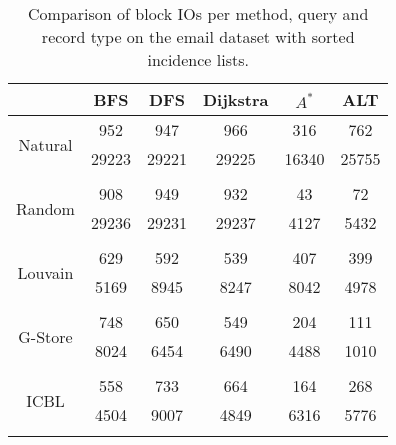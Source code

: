 \begin{table}
	\begin{center}
		 \begin{tabular}[c]{c c c c c c} \toprule
			  & BFS & DFS & Dijkstra & $A^*$  & ALT \\ \midrule 
 			\multirow{2}{*}{Natural}  & 952 & 947 & 966 & 316 & 762 \\ 
 				 & 29223 & 29221 & 29225 & 16340 & 25755 \\ 
 				&&&&& \\[-0.5em]
 			\multirow{2}{*}{Random}  & 908 & 949 & 932 & 43 & 72 \\ 
 				 & 29236 & 29231 & 29237 & 4127 & 5432 \\ 
 				&&&&& \\[-0.5em]
 			\multirow{2}{*}{Louvain}  & 629 & 592 & 539 & 407 & 399 \\ 
 				 & 5169 & 8945 & 8247 & 8042 & 4978 \\ 
 				&&&&& \\[-0.5em]
 			\multirow{2}{*}{G-Store}  & 748 & 650 & 549 & 204 & 111 \\ 
 				 & 8024 & 6454 & 6490 & 4488 & 1010 \\ 
 				&&&&& \\[-0.5em]
 			\multirow{2}{*}{ICBL}  & 558 & 733 & 664 & 164 & 268 \\ 
 				 & 4504 & 9007 & 4849 & 6316 & 5776 \\ 
 				&&&&& \\[-0.5em]
 					\end{tabular}  
  	 \end{center}
	 \caption{Comparison of block IOs per method, query and record type on the email dataset with sorted incidence lists.}
	 \label{email-s}
\end{table}
